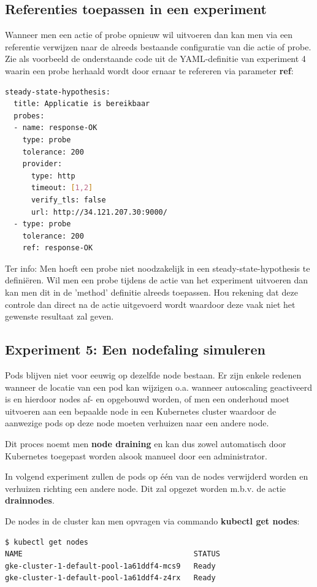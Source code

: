 \subsection{Referenties toepassen in een experiment}

Wanneer men een actie of probe opnieuw wil uitvoeren dan kan men via een referentie verwijzen naar de alreeds bestaande configuratie van die actie of probe. Zie als voorbeeld de onderstaande code uit de YAML-definitie van experiment 4 waarin een probe herhaald wordt door ernaar te refereren via parameter {\bf ref}:  

\begin{lstlisting}[language=bash] 
steady-state-hypothesis:
  title: Applicatie is bereikbaar
  probes:
  - name: response-OK
    type: probe
    tolerance: 200
    provider:
      type: http
      timeout: [1,2]
      verify_tls: false
      url: http://34.121.207.30:9000/
  - type: probe 
    tolerance: 200
    ref: response-OK
\end{lstlisting}

Ter info: Men hoeft een probe niet noodzakelijk in een steady-state-hypothesis te definiëren. Wil men  een probe tijdens de actie van het experiment uitvoeren dan kan men dit in de 'method' definitie alreeds toepassen. Hou rekening dat deze controle dan direct na de actie uitgevoerd wordt waardoor deze vaak niet het gewenste resultaat zal geven.

\subsection{Experiment 5: Een nodefaling simuleren}

Pods blijven niet voor eeuwig op dezelfde node bestaan. Er zijn enkele redenen wanneer de locatie van een pod kan wijzigen o.a. wanneer autoscaling geactiveerd is en hierdoor nodes af- en opgebouwd worden, of men een onderhoud moet uitvoeren aan een bepaalde node in een Kubernetes cluster waardoor de aanwezige pods op deze node moeten verhuizen naar een andere node. 

Dit proces noemt men {\bf node draining} en kan dus zowel automatisch door Kubernetes toegepast worden alsook manueel door een administrator. 

In volgend experiment zullen de pods op één van de nodes verwijderd worden en verhuizen richting een andere node. Dit zal opgezet worden m.b.v. de actie {\bf drain\textunderscore nodes}. \autocite{ChaosToolkit2022e} 

De nodes in de cluster kan men opvragen via commando {\bf kubectl get nodes}: 
\begin{lstlisting}[language=bash]
$ kubectl get nodes
NAME                                       STATUS
gke-cluster-1-default-pool-1a61ddf4-mcs9   Ready
gke-cluster-1-default-pool-1a61ddf4-z4rx   Ready
\end{lstlisting}

